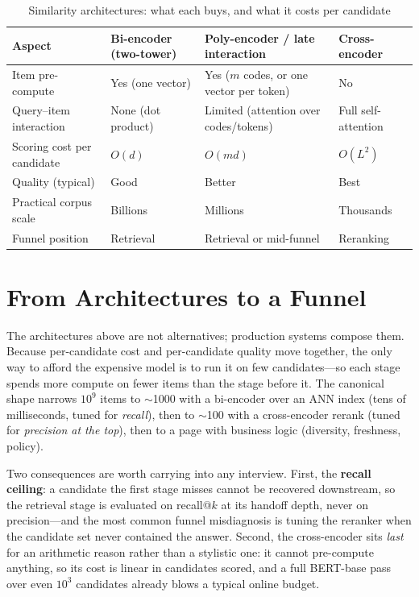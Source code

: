 \begin{table}[H]
\centering
\caption{Similarity architectures: what each buys, and what it costs per candidate}
\label{fig:poly_encoder}%
\begin{tabularx}{\textwidth}{lXXX}
\toprule
\textbf{Aspect} & \textbf{Bi-encoder (two-tower)} & \textbf{Poly-encoder / late interaction} & \textbf{Cross-encoder} \\
\midrule
Item pre-compute & Yes (one vector) & Yes ($m$ codes, or one vector per token) & No \\
Query--item interaction & None (dot product) & Limited (attention over codes/tokens) & Full self-attention \\
Scoring cost per candidate & $O(d)$ & $O(md)$ & $O(L^2)$ \\
Quality (typical) & Good & Better & Best \\
Practical corpus scale & Billions & Millions & Thousands \\
Funnel position & Retrieval & Retrieval or mid-funnel & Reranking \\
\bottomrule
\end{tabularx}
\end{table}

\section{From Architectures to a Funnel}
\label{sec:two_stage}

The architectures above are not alternatives; production systems compose them. Because per-candidate cost and per-candidate quality move together, the only way to afford the expensive model is to run it on few candidates---so each stage spends more compute on fewer items than the stage before it. The canonical shape narrows $10^9$ items to $\sim$1000 with a bi-encoder over an ANN index (tens of milliseconds, tuned for \textit{recall}), then to $\sim$100 with a cross-encoder rerank (tuned for \textit{precision at the top}), then to a page with business logic (diversity, freshness, policy).
\label{fig:two_stage}%

Two consequences are worth carrying into any interview. First, the \textbf{recall ceiling}: a candidate the first stage misses cannot be recovered downstream, so the retrieval stage is evaluated on recall@$k$ at its handoff depth, never on precision---and the most common funnel misdiagnosis is tuning the reranker when the candidate set never contained the answer. Second, the cross-encoder sits \textit{last} for an arithmetic reason rather than a stylistic one: it cannot pre-compute anything, so its cost is linear in candidates scored, and a full BERT-base pass over even $10^3$ candidates already blows a typical online budget.

